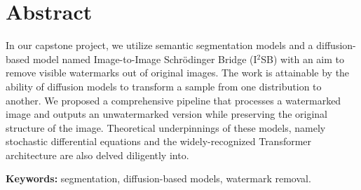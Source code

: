 \chapter*{Abstract}
In our capstone project, we utilize semantic segmentation models and a diffusion-based model named Image-to-Image Schrödinger Bridge (I$^2$SB) with an aim to remove visible watermarks out of original images. The work is attainable by the ability of diffusion models to transform a sample from one distribution to another. We proposed a comprehensive pipeline that processes a watermarked image and outputs an unwatermarked version while preserving the original structure of the image. Theoretical underpinnings of these models, namely stochastic differential equations and the widely-recognized Transformer architecture are also delved diligently into. 

\textbf{Keywords:} segmentation, diffusion-based models, watermark removal.